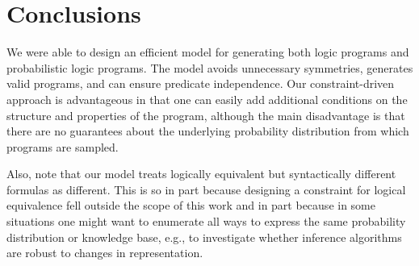 \documentclass[runningheads]{llncs}
\begin{document}
\section{Conclusions}

We were able to design an efficient model for generating both logic programs and
probabilistic logic programs. The model avoids unnecessary symmetries, generates
valid programs, and can ensure predicate independence. Our constraint-driven
approach is advantageous in that one can easily add additional conditions on the
structure and properties of the program, although the main disadvantage is
that there are no guarantees about the underlying probability distribution from
which programs are sampled.

Also, note that our model treats logically equivalent but syntactically
different formulas as different. This is so in part because designing a
constraint for logical equivalence fell outside the scope of this work and in
part because in some situations one might want to enumerate all ways to express
the same probability distribution or knowledge base, e.g., to investigate
whether inference algorithms are robust to changes in representation.




\end{document}
